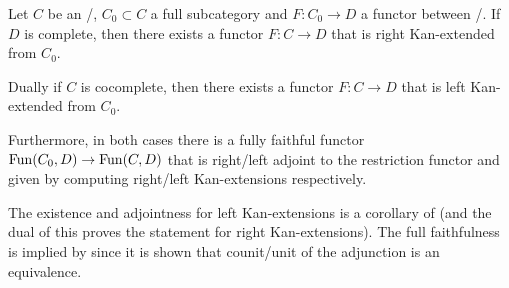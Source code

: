 \begin{prop}\label{prop:exKanExt}
    Let $C$ be an \inftycat/, $C_0\subset C$ a full subcategory and $F\colon C_0\to D$ a functor between \inftycats/.
    If $D$ is complete, then there exists a functor $F\colon C\to D$ that is right Kan-extended from $C_0$.

    Dually if $C$ is cocomplete, then there exists a functor $F\colon C\to D$ that is left Kan-extended from $C_0$.
    
    Furthermore, in both cases there is a fully faithful functor $\operatorname{Fun}(C_0,D)\to\operatorname{Fun}(C,D)$ that is right/left adjoint to the restriction functor and given by computing right/left Kan-extensions respectively.
    \begin{reference}
        The existence and adjointness for left Kan-extensions is a corollary of \cite[Corollary 7.3.6.4]{kerodon} (and the dual of this proves the statement for right Kan-extensions).
        The full faithfulness is implied by \cite[Corollary 7.3.1.16]{kerodon} since it is shown that counit/unit of the adjunction is an equivalence.
    \end{reference}
\end{prop}
